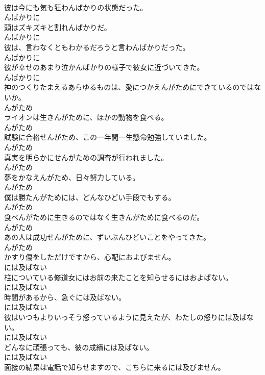 \documentclass[8pt]{extreport}
\begin{document}
\begin{CJK}{UTF8}{min}
\\	彼は今にも気も狂わんばかりの状態だった。	
\\	んばかりに
\\	頭はズキズキと割れんばかりだ。	
\\	んばかりに
\\	彼は、言わなくともわかるだろうと言わんばかりだった。	
\\	んばかりに
\\	彼が幸せのあまり泣かんばかりの様子で彼女に近づいてきた。	
\\	んばかりに
\\	神のつくりたまえるあらゆるものは、愛につかえんがためにできているのではないか。	
\\	んがため
\\	ライオンは生きんがために、ほかの動物を食べる。	
\\	んがため
\\	試験に合格せんがため、この一年間一生懸命勉強していました。	
\\	んがため
\\	真実を明らかにせんがための調査が行われました。	
\\	んがため
\\	夢をかなえんがため、日々努力している。	
\\	んがため
\\	僕は勝たんがためには、どんなひどい手段でもする。	
\\	んがため
\\	食べんがために生きるのではなく生きんがために食べるのだ。	
\\	んがため
\\	あの人は成功せんがために、ずいぶんひどいことをやってきた。	
\\	んがため
\\	かすり傷をしただけですから、心配におよびません。	
\\	には及ばない
\\	柱についている修道女にはお前の来たことを知らせるにはおよばない。	
\\	には及ばない
\\	時間があるから、急ぐには及ばない。	
\\	には及ばない
\\	彼はいつもよりいっそう怒っているように見えたが、わたしの怒りには及ばない。	
\\	には及ばない
\\	どんなに頑張っても、彼の成績には及ばない。	
\\	には及ばない
\\	面接の結果は電話で知らせますので、こちらに来るには及びません。	

\end{CJK}
\end{document}
